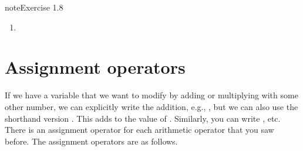 \documentclass[letterpaper,10pt,english]{jupyterBook}
\begin{document}
\begin{sphinxadmonition}{note}{Exercise 1.8}
\begin{sphinxVerbatim}[commandchars=\\\{\}]
  
  
  
  
  
  
  
  
\end{sphinxVerbatim}
\begin{enumerate}
%
\setcounter{enumi}{3}
\item {} 
\end{enumerate}

\begin{sphinxVerbatim}[commandchars=\\\{\}]
  
  
    
      
  
  
  
\end{sphinxVerbatim}
\end{sphinxadmonition}


\section{Assignment operators}
\label{\detokenize{notebooks/01_GettingStarted/01_GettingStarted_student:assignment-operators}}
\sphinxAtStartPar
If we have a variable that we want to modify by adding or multiplying with some other number, we can explicitly write the addition, e.g., , but we can also use the shorthand version . This adds  to the value of . Similarly, you can write , etc. There is an assignment operator for each arithmetic operator that you saw before. The assignment operators are as follows.
\end{document}
